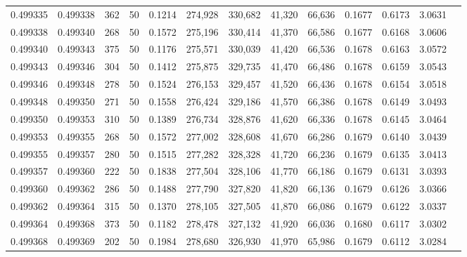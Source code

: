 \begin{tabular}{rrrrrrrrrrrrr}
0.499335 & 0.499338 & 362 &  50 &                                     0.1214 & 274,928 & 330,682 &  41,320 &  66,636 & 0.1677 & 0.6173 & 3.0631 \\
0.499338 & 0.499340 & 268 &  50 &                                     0.1572 & 275,196 & 330,414 &  41,370 &  66,586 & 0.1677 & 0.6168 & 3.0606 \\
0.499340 & 0.499343 & 375 &  50 &                                     0.1176 & 275,571 & 330,039 &  41,420 &  66,536 & 0.1678 & 0.6163 & 3.0572 \\
0.499343 & 0.499346 & 304 &  50 &                                     0.1412 & 275,875 & 329,735 &  41,470 &  66,486 & 0.1678 & 0.6159 & 3.0543 \\
0.499346 & 0.499348 & 278 &  50 &                                     0.1524 & 276,153 & 329,457 &  41,520 &  66,436 & 0.1678 & 0.6154 & 3.0518 \\
0.499348 & 0.499350 & 271 &  50 &                                     0.1558 & 276,424 & 329,186 &  41,570 &  66,386 & 0.1678 & 0.6149 & 3.0493 \\
0.499350 & 0.499353 & 310 &  50 &                                     0.1389 & 276,734 & 328,876 &  41,620 &  66,336 & 0.1678 & 0.6145 & 3.0464 \\
0.499353 & 0.499355 & 268 &  50 &                                     0.1572 & 277,002 & 328,608 &  41,670 &  66,286 & 0.1679 & 0.6140 & 3.0439 \\
0.499355 & 0.499357 & 280 &  50 &                                     0.1515 & 277,282 & 328,328 &  41,720 &  66,236 & 0.1679 & 0.6135 & 3.0413 \\
0.499357 & 0.499360 & 222 &  50 &                                     0.1838 & 277,504 & 328,106 &  41,770 &  66,186 & 0.1679 & 0.6131 & 3.0393 \\
0.499360 & 0.499362 & 286 &  50 &                                     0.1488 & 277,790 & 327,820 &  41,820 &  66,136 & 0.1679 & 0.6126 & 3.0366 \\
0.499362 & 0.499364 & 315 &  50 &                                     0.1370 & 278,105 & 327,505 &  41,870 &  66,086 & 0.1679 & 0.6122 & 3.0337 \\
0.499364 & 0.499368 & 373 &  50 &                                     0.1182 & 278,478 & 327,132 &  41,920 &  66,036 & 0.1680 & 0.6117 & 3.0302 \\
0.499368 & 0.499369 & 202 &  50 &                                     0.1984 & 278,680 & 326,930 &  41,970 &  65,986 & 0.1679 & 0.6112 & 3.0284 \\

\end{tabular}
